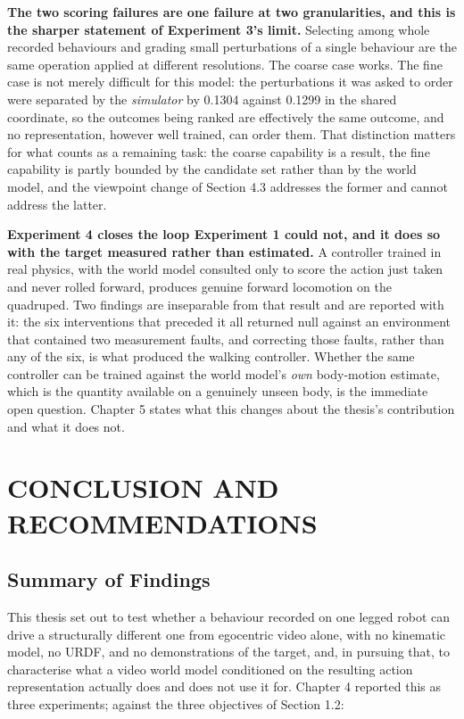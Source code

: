 \documentclass[12pt,a4paper,oneside]{report}
\begin{document}
\noindent\textbf{The two scoring failures are one failure at two granularities, and this is the sharper statement
of Experiment 3's limit.} Selecting among whole recorded behaviours and grading small perturbations of a single
behaviour are the same operation applied at different resolutions. The coarse case works. The fine case is not
merely difficult for this model: the perturbations it was asked to order were separated by the \emph{simulator} by
0.1304 against 0.1299 in the shared coordinate, so the outcomes being ranked are effectively the same outcome, and
no representation, however well trained, can order them. That distinction matters for what counts as a remaining
task: the coarse capability is a result, the fine capability is partly bounded by the candidate set rather than by
the world model, and the viewpoint change of Section 4.3 addresses the former and cannot address the latter.

\noindent\textbf{Experiment 4 closes the loop Experiment 1 could not, and it does so with the target measured
rather than estimated.} A controller trained in real physics, with the world model consulted only to score the
action just taken and never rolled forward, produces genuine forward locomotion on the quadruped. Two findings
are inseparable from that result and are reported with it: the six interventions that preceded it all returned
null against an environment that contained two measurement faults, and correcting those faults, rather than any
of the six, is what produced the walking controller. Whether the same controller can be trained against the world
model's \emph{own} body-motion estimate, which is the quantity available on a genuinely unseen body, is the
immediate open question. Chapter 5 states what this changes about the thesis's contribution and what it does not.

\chapter{CONCLUSION AND RECOMMENDATIONS}

\section{Summary of Findings}
This thesis set out to test whether a behaviour recorded on one legged robot can drive a structurally different
one from egocentric video alone, with no kinematic model, no URDF, and no demonstrations of the target, and, in
pursuing that, to characterise what a video world model conditioned on the resulting action representation
actually does and does not use it for. Chapter 4 reported this as three experiments; against the three objectives
of Section 1.2:
\end{document}
